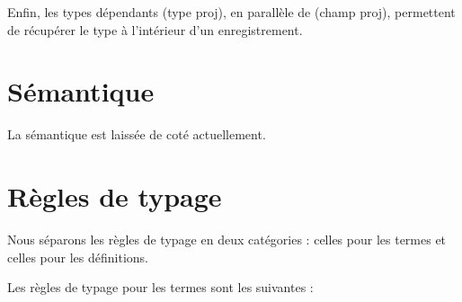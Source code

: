 Enfin, les types dépendants (type proj), en parallèle de (champ proj),
permettent de récupérer le type à l'intérieur d'un enregistrement.

\section{Sémantique}

La sémantique est laissée de coté actuellement.

\section{Règles de typage}

Nous séparons les règles de typage en deux catégories : celles pour les termes
et celles pour les définitions.

Les règles de typage pour les termes sont les suivantes :


